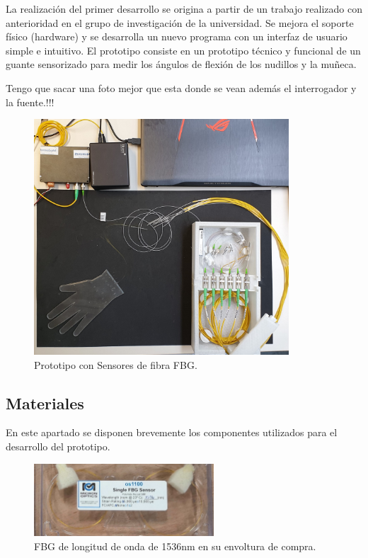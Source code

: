 La realización del primer desarrollo se origina a partir de un trabajo realizado con anterioridad en el grupo de investigación de la universidad\cite{SilviaTFM}. Se mejora el soporte físico (hardware) y se desarrolla un nuevo programa con un interfaz de usuario simple e intuitivo.
El prototipo consiste en un prototipo técnico y funcional de un guante sensorizado para medir los ángulos de flexión de los nudillos y la muñeca.

 \textcolor{rositaoscuro}{Tengo que sacar una foto mejor que esta donde se vean además el interrogador y la fuente.!!!}
	\begin{figure}[H]
		\centering
		\includegraphics[width=0.85\textwidth]{./img/prototipo}
		\caption{Prototipo con Sensores de fibra FBG.} \label{fig:prototipoFBG}
	\end{figure}


 
\subsection{Materiales}
\label{sec:materiales3}
En este apartado se disponen brevemente los componentes utilizados para el desarrollo del prototipo. 

\begin{figure}[H]
	\centering
	\includegraphics[width=0.60\textwidth]{./img/fibraBraggpaquete2}
	\caption{FBG de longitud de onda de 1536nm en su envoltura de compra.} \label{fig:FBGpaquete}
\end{figure}

